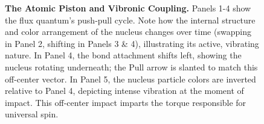 \documentclass[11pt, a4paper]{article}
\begin{document}
\begin{figure}[!ht]
\caption{\textbf{The Atomic Piston and Vibronic Coupling.} Panels 1-4 show the flux quantum's push-pull cycle. Note how the internal structure and color arrangement of the nucleus changes over time (swapping in Panel 2, shifting in Panels 3 \& 4), illustrating its active, vibrating nature. In Panel 4, the bond attachment shifts left, showing the nucleus rotating underneath; the Pull arrow is slanted to match this off-center vector. In Panel 5, the nucleus particle colors are inverted relative to Panel 4, depicting intense vibration at the moment of impact. This off-center impact imparts the torque responsible for universal spin.}
\label{fig:atomic_piston}
\end{figure}
\end{document}
